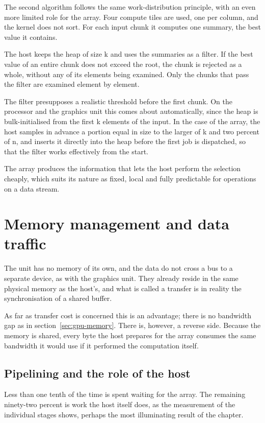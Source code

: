 The second algorithm follows the same work-distribution principle, with an even
more limited role for the array. Four compute tiles are used, one per column,
and the kernel does not sort. For each input chunk it computes one summary, the
best value it contains.

The host keeps the heap of size k and uses the summaries as a filter. If the
best value of an entire chunk does not exceed the root, the chunk is rejected
as a whole, without any of its elements being examined. Only the chunks that
pass the filter are examined element by element.

The filter presupposes a realistic threshold before the first chunk. On the
processor and the graphics unit this comes about automatically, since the heap
is bulk-initialised from the first k elements of the input. In the case of the
array, the host samples in advance a portion equal in size to the larger of k
and two percent of n, and inserts it directly into the heap before the first
job is dispatched, so that the filter works effectively from the start.

The array produces the information that lets the host perform the selection
cheaply, which suits its nature as fixed, local and fully predictable for
operations on a data stream.

\section{Memory management and data traffic}
\label{sec:npu-memory}

The unit has no memory of its own, and the data do not cross a bus to a
separate device, as with the graphics unit. They already reside in the same
physical memory as the host's, and what is called a transfer is in reality the
synchronisation of a shared buffer.

As far as transfer cost is concerned this is an advantage; there is no
bandwidth gap as in section~\ref{sec:gpu-memory}. There is, however, a reverse
side. Because the memory is shared, every byte the host prepares for the array
consumes the same bandwidth it would use if it performed the computation
itself.

\subsection{Pipelining and the role of the host}
\label{sec:npu-pipeline}

Less than one tenth of the time is spent waiting for the array. The remaining
ninety-two percent is work the host itself does, as the measurement of the
individual stages shows, perhaps the most illuminating result of the chapter.

